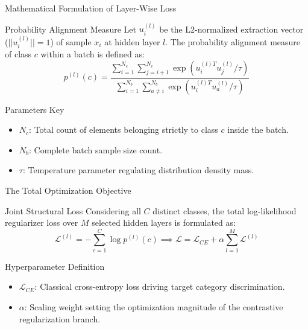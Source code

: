 \documentclass[t, aspectratio=169]{beamer} %
\begin{document}
	\begin{frame}{Mathematical Formulation of Layer-Wise Loss}
		\begin{block}{Probability Alignment Measure}
			Let $u_i^{(l)}$ be the L2-normalized extraction vector ($||u_i^{(l)}||=1$) of sample $x_i$ at hidden layer $l$. The probability alignment measure of class $c$ within a batch is defined as:
			$$ p^{(l)}(c) = \frac{\sum_{i=1}^{N_c}\sum_{j=i+1}^{N_c} \exp(u_i^{(l)T}u_j^{(l)} / \tau)}{\sum_{i=1}^{N_b}\sum_{a \neq i}^{N_b}\exp(u_i^{(l)T}u_a^{(l)} / \tau)} $$
		\end{block}
		\begin{alertblock}{Parameters Key}
			\begin{itemize}
				\item $N_c$: Total count of elements belonging strictly to class $c$ inside the batch.
				\item $N_b$: Complete batch sample size count.
				\item $\tau$: Temperature parameter regulating distribution density mass.
			\end{itemize}
		\end{alertblock}
	\end{frame}

	\begin{frame}{The Total Optimization Objective}
		\begin{block}{Joint Structural Loss}
			Considering all $C$ distinct classes, the total log-likelihood regularizer loss over $M$ selected hidden layers is formulated as:
			$$ \mathcal{L}^{(l)} = -\sum_{c=1}^{C}\log p^{(l)}(c) \implies \mathcal{L} = \mathcal{L}_{CE} + \alpha \sum_{l=1}^{M}\mathcal{L}^{(l)} $$
		\end{block}
		\begin{alertblock}{Hyperparameter Definition}
			\begin{itemize}
				\item $\mathcal{L}_{CE}$: Classical cross-entropy loss driving target category discrimination.
				\item $\alpha$: Scaling weight setting the optimization magnitude of the contrastive regularization branch.
			\end{itemize}
		\end{alertblock}
	\end{frame}
\end{document}
